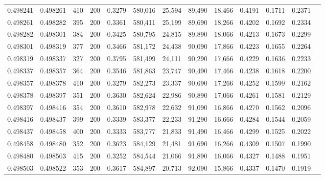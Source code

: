 \begin{tabular}{rrrrrrrrrrrrr}
0.498241 & 0.498261 &   410 & 200 &                                     0.3279 & 580,016 &  25,594 &  89,490 &  18,466 & 0.4191 & 0.1711 & 0.2371 \\
0.498261 & 0.498282 &   395 & 200 &                                     0.3361 & 580,411 &  25,199 &  89,690 &  18,266 & 0.4202 & 0.1692 & 0.2334 \\
0.498282 & 0.498301 &   384 & 200 &                                     0.3425 & 580,795 &  24,815 &  89,890 &  18,066 & 0.4213 & 0.1673 & 0.2299 \\
0.498301 & 0.498319 &   377 & 200 &                                     0.3466 & 581,172 &  24,438 &  90,090 &  17,866 & 0.4223 & 0.1655 & 0.2264 \\
0.498319 & 0.498337 &   327 & 200 &                                     0.3795 & 581,499 &  24,111 &  90,290 &  17,666 & 0.4229 & 0.1636 & 0.2233 \\
0.498337 & 0.498357 &   364 & 200 &                                     0.3546 & 581,863 &  23,747 &  90,490 &  17,466 & 0.4238 & 0.1618 & 0.2200 \\
0.498357 & 0.498378 &   410 & 200 &                                     0.3279 & 582,273 &  23,337 &  90,690 &  17,266 & 0.4252 & 0.1599 & 0.2162 \\
0.498378 & 0.498397 &   351 & 200 &                                     0.3630 & 582,624 &  22,986 &  90,890 &  17,066 & 0.4261 & 0.1581 & 0.2129 \\
0.498397 & 0.498416 &   354 & 200 &                                     0.3610 & 582,978 &  22,632 &  91,090 &  16,866 & 0.4270 & 0.1562 & 0.2096 \\
0.498416 & 0.498437 &   399 & 200 &                                     0.3339 & 583,377 &  22,233 &  91,290 &  16,666 & 0.4284 & 0.1544 & 0.2059 \\
0.498437 & 0.498458 &   400 & 200 &                                     0.3333 & 583,777 &  21,833 &  91,490 &  16,466 & 0.4299 & 0.1525 & 0.2022 \\
0.498458 & 0.498480 &   352 & 200 &                                     0.3623 & 584,129 &  21,481 &  91,690 &  16,266 & 0.4309 & 0.1507 & 0.1990 \\
0.498480 & 0.498503 &   415 & 200 &                                     0.3252 & 584,544 &  21,066 &  91,890 &  16,066 & 0.4327 & 0.1488 & 0.1951 \\
0.498503 & 0.498522 &   353 & 200 &                                     0.3617 & 584,897 &  20,713 &  92,090 &  15,866 & 0.4337 & 0.1470 & 0.1919 \\

\end{tabular}
